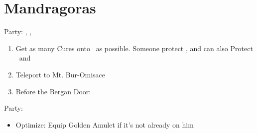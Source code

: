 \chapter{Mandragoras}
\begin{menu}
	Party: \basch, \balthier, \fran
\end{menu}
\begin{enumerate}
	\item Get as many Cures onto \basch\ as possible. Someone protect \basch, and can also Protect \fran\ and \balthier
	\item Teleport to Mt. Bur-Omisace
	\item Before the Bergan Door: 
\end{enumerate}
\begin{menu}
	Party: \vaan
\end{menu}
\begin{equip}
	\begin{itemize}
		\item Optimize: \vaan
		      \vaanf Equip Golden Amulet if it's not already on him
	\end{itemize}
\end{equip}
